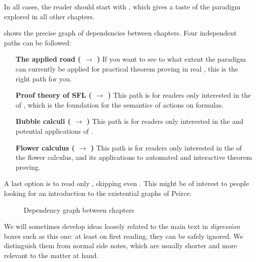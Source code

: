 \begin{emphpar}
  In all cases, the reader should start with , which gives a taste of
  the  paradigm explored in all other chapters.
\end{emphpar}

 shows the precise graph of dependencies between chapters.
Four independent paths can be followed:
\begin{itemize}
  \item[\textbf{The applied road (\ding{175} $\to$ \ding{177})}] If
  you want to see to what extent the  paradigm can currently be applied for
  practical theorem proving in real , this is the right path for
  you.

  \item[\textbf{Proof theory of SFL (\ding{174} $\to$ \ding{176})}]
  This path is for readers only interested in the  of , which is the foundation for the semantics of  actions on 
  formulas.

  \item[\textbf{Bubble calculi (\ding{178} $\to$ \ding{179})}]
  This path is for readers only interested in the  and potential
  applications of .
  
  \item[\textbf{Flower calculus (\ding{180} $\to$ \ding{181})}] This path is for
  readers only interested in the  of the flower calculus, and its
  applications to automated and interactive theorem proving.
\end{itemize}

A last option is to read only , skipping even . This might
be of interest to people looking for an introduction to the existential graphs
of Peirce.

\begin{figure*}
  \caption{Dependency graph between chapters}
\end{figure*}

\begin{digression}
  We will sometimes develop ideas loosely related to the main text in
  \emph{digression} boxes such as this one: at least on first reading, they can
  be safely ignored. We distinguish them from normal side notes, which are
  usually shorter and more relevant to the matter at hand.
\end{digression}

